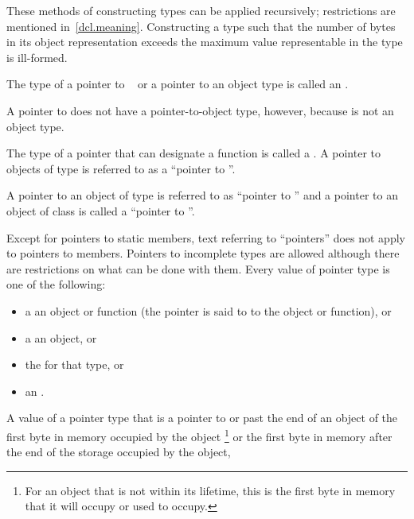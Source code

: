 \pnum
These methods of constructing types can be applied recursively;
restrictions are mentioned in~\ref{dcl.meaning}.
Constructing a type such that the number of
bytes in its object representation exceeds the maximum value representable in
the type  is ill-formed.

\pnum
{}%
The type of a pointer to \cv{}~ or a pointer to an object type is
called an .
\begin{note}
A pointer to 
does not have a pointer-to-object type, however, because  is not
an object type.
\end{note}
The type of a pointer that can designate a function
is called a .
A pointer to objects of type  is referred to as a ``pointer to
''.
\begin{example}
A pointer to an object of type  is
referred to as ``pointer to '' and a pointer to an object of
class  is called a ``pointer to ''.
\end{example}
Except for pointers to static members, text referring to ``pointers''
does not apply to pointers to members. Pointers to incomplete types are
allowed although there are restrictions on what can be done with
them.
%
Every value of pointer type is one of the following:
\begin{itemize}
\item
a  an object or function (the pointer is said to  to the object or function), or
\item
a  an object, or
\item
{}
the  for that type, or
\item
{}
an .
\end{itemize}
A value of a
pointer type
that is a pointer to or past the end of an object
 of
the first byte in memory occupied by the object%
\footnote{For an object that is not within its lifetime,
this is the first byte in memory that it will occupy or used to occupy.}
or the first byte in memory
after the end of the storage occupied by the object,
